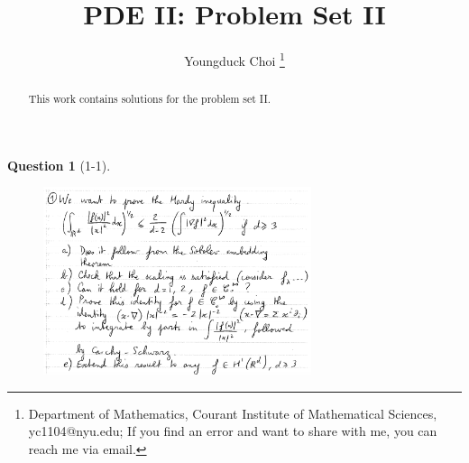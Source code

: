 \documentclass[11pt]{article}
\date{}
\title{\vspace{-0.7cm}
PDE II: Problem Set II}
\author{
Youngduck Choi 
\thanks{Department of Mathematics, Courant Institute of Mathematical Sciences, 
yc1104@nyu.edu; If you find an error and want to share with me, 
you can reach me via email.
}}
\theoremstyle{plain}
\theoremstyle{quest}
\newtheorem*{question}{Question}
\begin{document}
\maketitle

\begin{abstract}
This work contains solutions for the problem set II.
\end{abstract}


\begin{question}[1-1]
\hfill
\begin{figure}[h!]
  \centering
    \includegraphics[width=0.7\textwidth]{pde2-s34-p1.png}
\end{figure}
\end{question}
\end{document}
